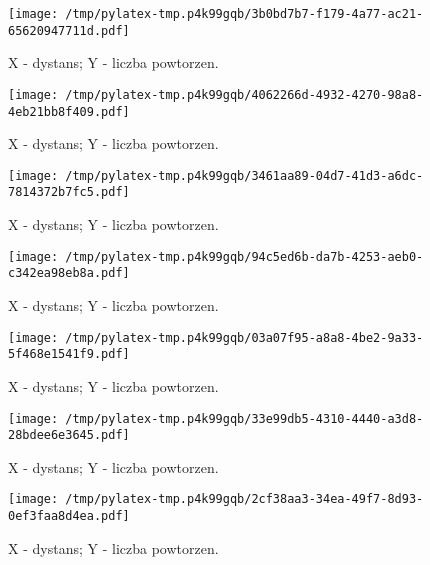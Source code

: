 \documentclass{article}%
\begin{document}
%
\newpage%


\begin{figure}[h]%
\centering%
\texttt{[image: /tmp/pylatex-tmp.p4k99gqb/3b0bd7b7-f179-4a77-ac21-65620947711d.pdf]}%
\caption{X {-} dystans; Y {-} liczba powtorzen.}%
\end{figure}

%
\newpage%


\begin{figure}[h]%
\centering%
\texttt{[image: /tmp/pylatex-tmp.p4k99gqb/4062266d-4932-4270-98a8-4eb21bb8f409.pdf]}%
\caption{X {-} dystans; Y {-} liczba powtorzen.}%
\end{figure}

%
\newpage%


\begin{figure}[h]%
\centering%
\texttt{[image: /tmp/pylatex-tmp.p4k99gqb/3461aa89-04d7-41d3-a6dc-7814372b7fc5.pdf]}%
\caption{X {-} dystans; Y {-} liczba powtorzen.}%
\end{figure}

%
\newpage%


\begin{figure}[h]%
\centering%
\texttt{[image: /tmp/pylatex-tmp.p4k99gqb/94c5ed6b-da7b-4253-aeb0-c342ea98eb8a.pdf]}%
\caption{X {-} dystans; Y {-} liczba powtorzen.}%
\end{figure}

%
\newpage%


\begin{figure}[h]%
\centering%
\texttt{[image: /tmp/pylatex-tmp.p4k99gqb/03a07f95-a8a8-4be2-9a33-5f468e1541f9.pdf]}%
\caption{X {-} dystans; Y {-} liczba powtorzen.}%
\end{figure}

%
\newpage%


\begin{figure}[h]%
\centering%
\texttt{[image: /tmp/pylatex-tmp.p4k99gqb/33e99db5-4310-4440-a3d8-28bdee6e3645.pdf]}%
\caption{X {-} dystans; Y {-} liczba powtorzen.}%
\end{figure}

%
\newpage%


\begin{figure}[h]%
\centering%
\texttt{[image: /tmp/pylatex-tmp.p4k99gqb/2cf38aa3-34ea-49f7-8d93-0ef3faa8d4ea.pdf]}%
\caption{X {-} dystans; Y {-} liczba powtorzen.}%
\end{figure}
\end{document}
